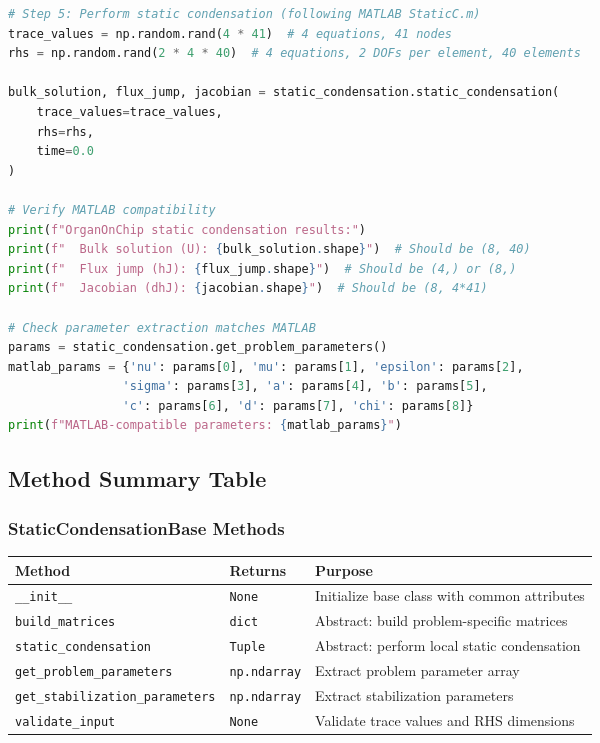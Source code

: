 \begin{lstlisting}[language=Python, caption=Complete OrganOnChip Workflow]
# Step 5: Perform static condensation (following MATLAB StaticC.m)
trace_values = np.random.rand(4 * 41)  # 4 equations, 41 nodes
rhs = np.random.rand(2 * 4 * 40)  # 4 equations, 2 DOFs per element, 40 elements

bulk_solution, flux_jump, jacobian = static_condensation.static_condensation(
    trace_values=trace_values,
    rhs=rhs,
    time=0.0
)

# Verify MATLAB compatibility
print(f"OrganOnChip static condensation results:")
print(f"  Bulk solution (U): {bulk_solution.shape}")  # Should be (8, 40)
print(f"  Flux jump (hJ): {flux_jump.shape}")  # Should be (4,) or (8,)
print(f"  Jacobian (dhJ): {jacobian.shape}")  # Should be (8, 4*41)

# Check parameter extraction matches MATLAB
params = static_condensation.get_problem_parameters()
matlab_params = {'nu': params[0], 'mu': params[1], 'epsilon': params[2], 
                'sigma': params[3], 'a': params[4], 'b': params[5], 
                'c': params[6], 'd': params[7], 'chi': params[8]}
print(f"MATLAB-compatible parameters: {matlab_params}")
\end{lstlisting}

\subsection{Method Summary Table}
\label{subsec:static_condensation_method_summary}

\subsubsection{StaticCondensationBase Methods}

\begin{longtable}{|p{5.5cm}|p{2cm}|p{7cm}|}
\hline
\textbf{Method} & \textbf{Returns} & \textbf{Purpose} \\
\hline
\endhead

\texttt{\_\_init\_\_} & \texttt{None} & Initialize base class with common attributes \\
\hline

\texttt{build\_matrices} & \texttt{dict} & Abstract: build problem-specific matrices \\
\hline

\texttt{static\_condensation} & \texttt{Tuple} & Abstract: perform local static condensation \\
\hline

\texttt{get\_problem\_parameters} & \texttt{np.ndarray} & Extract problem parameter array \\
\hline

\texttt{get\_stabilization\_parameters} & \texttt{np.ndarray} & Extract stabilization parameters \\
\hline

\texttt{validate\_input} & \texttt{None} & Validate trace values and RHS dimensions \\
\hline

\end{longtable}

